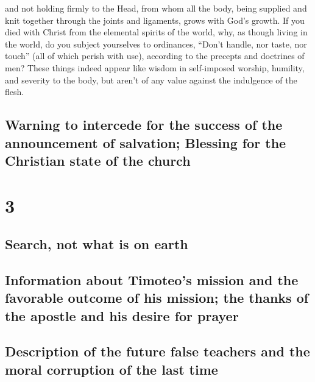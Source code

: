  and not holding firmly to the Head, from whom all the
body, being supplied and knit together through the joints and ligaments,
grows with God's growth.  If you died with Christ from
the elemental spirits of the world, why, as though living in the world,
do you subject yourselves to ordinances,  ``Don't handle,
nor taste, nor touch''  (all of which perish with use),
according to the precepts and doctrines of men?  These
things indeed appear like wisdom in self-imposed worship, humility, and
severity to the body, but aren't of any value against the indulgence of
the flesh.

\hypertarget{warning-to-intercede-for-the-success-of-the-announcement-of-salvation-blessing-for-the-christian-state-of-the-church}{%
\subsection{Warning to intercede for the success of the announcement of
salvation; Blessing for the Christian state of the
church}\label{warning-to-intercede-for-the-success-of-the-announcement-of-salvation-blessing-for-the-christian-state-of-the-church}}

\hypertarget{section-2}{%
\section{3}\label{section-2}}

\hypertarget{search-not-what-is-on-earth}{%
\subsection{Search, not what is on
earth}\label{search-not-what-is-on-earth}}

\hypertarget{information-about-timoteos-mission-and-the-favorable-outcome-of-his-mission-the-thanks-of-the-apostle-and-his-desire-for-prayer}{%
\subsection{Information about Timoteo's mission and the favorable
outcome of his mission; the thanks of the apostle and his desire for
prayer}\label{information-about-timoteos-mission-and-the-favorable-outcome-of-his-mission-the-thanks-of-the-apostle-and-his-desire-for-prayer}}

\hypertarget{description-of-the-future-false-teachers-and-the-moral-corruption-of-the-last-time}{%
\subsection{Description of the future false teachers and the moral
corruption of the last
time}\label{description-of-the-future-false-teachers-and-the-moral-corruption-of-the-last-time}}


